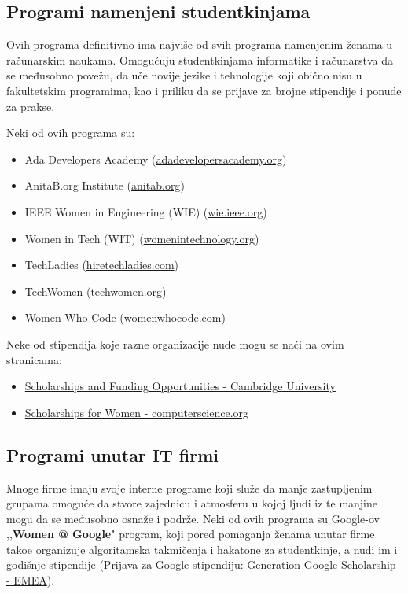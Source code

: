 \documentclass[12pt]{article}
\begin{document}
\subsection{Programi namenjeni studentkinjama}

Ovih programa definitivno ima najviše od svih programa namenjenim ženama u računarskim naukama. Omogućuju studentkinjama informatike i računarstva da se međusobno povežu, da uče novije jezike i tehnologije koji obično nisu u fakultetskim programima, kao i priliku da se prijave za brojne stipendije i ponude za prakse.

Neki od ovih programa su:
\begin{itemize}
    \item Ada Developers Academy (\href{https://adadevelopersacademy.org/}{adadevelopersacademy.org})
    \item AnitaB.org Institute (\href{https://anitab.org/}{anitab.org})
    \item IEEE Women in Engineering (WIE) (\href{https://wie.ieee.org/}{wie.ieee.org})
    \item Women in Tech (WIT) (\href{https://www.womenintechnology.org/}{womenintechnology.org})
    \item TechLadies (\href{https://www.hiretechladies.com/}{hiretechladies.com})
    \item TechWomen (\href{https://www.techwomen.org/}{techwomen.org})
    \item Women Who Code (\href{https://womenwhocode.com/}{womenwhocode.com})
\end{itemize}

Neke od stipendija koje razne organizacije nude mogu se naći na ovim stranicama:

\begin{itemize}
    \item \href{https://www.cst.cam.ac.uk/women/scholarships}{Scholarships and Funding Opportunities - Cambridge University}
    \item \href{https://www.computerscience.org/scholarships-women/}{Scholarships for Women - computerscience.org}
\end{itemize}

\subsection{Programi unutar IT firmi}

Mnoge firme imaju svoje interne programe koji služe da manje zastupljenim grupama omoguće da stvore zajednicu i atmosferu u kojoj ljudi iz te manjine mogu da se međusobno osnaže i podrže. Neki od ovih programa su Google-ov ,,\textbf{Women @ Google}" program, koji pored pomaganja ženama unutar firme tako\dj e organizuje algoritamska takmičenja i hakatone za studentkinje, a nudi im i godišnje stipendije (Prijava za Google stipendiju: \href{https://buildyourfuture.withgoogle.com/scholarships/generation-google-scholarship-emea}{Generation Google Scholarship - EMEA}).
\end{document}
